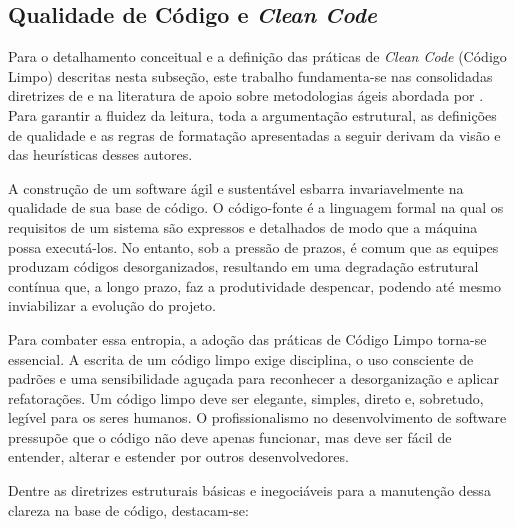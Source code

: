 \subsection{Qualidade de Código e \textit{Clean Code}}

Para o detalhamento conceitual e a definição das práticas de \textit{Clean Code} (Código Limpo) descritas nesta subseção, este trabalho fundamenta-se nas consolidadas diretrizes de  e na literatura de apoio sobre metodologias ágeis abordada por . Para garantir a fluidez da leitura, toda a argumentação estrutural, as definições de qualidade e as regras de formatação apresentadas a seguir derivam da visão e das heurísticas desses autores. %

A construção de um software ágil e sustentável esbarra invariavelmente na qualidade de sua base de código. O código-fonte é a linguagem formal na qual os requisitos de um sistema são expressos e detalhados de modo que a máquina possa executá-los. No entanto, sob a pressão de prazos, é comum que as equipes produzam códigos desorganizados, resultando em uma degradação estrutural contínua que, a longo prazo, faz a produtividade despencar, podendo até mesmo inviabilizar a evolução do projeto. %

Para combater essa entropia, a adoção das práticas de Código Limpo torna-se essencial. A escrita de um código limpo exige disciplina, o uso consciente de padrões e uma sensibilidade aguçada para reconhecer a desorganização e aplicar refatorações. Um código limpo deve ser elegante, simples, direto e, sobretudo, legível para os seres humanos. O profissionalismo no desenvolvimento de software pressupõe que o código não deve apenas funcionar, mas deve ser fácil de entender, alterar e estender por outros desenvolvedores. %

Dentre as diretrizes estruturais básicas e inegociáveis para a manutenção dessa clareza na base de código, destacam-se: %

